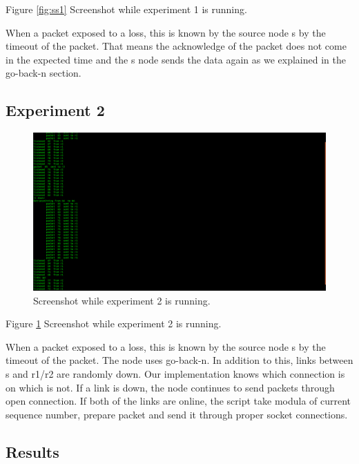 \documentclass[conference]{IEEEtran}
\begin{document}
Figure \ref{fig:ss1} Screenshot while experiment 1 is running.

When a packet exposed to a loss, this is known by the source node s by the timeout of the packet. That means the acknowledge of the packet does not come in the expected time and the s node sends the data again as we explained in the go-back-n section.

\subsection{Experiment 2}

\begin{figure}[h]
  \includegraphics[width=\linewidth]{experiment2.png}
  \caption{Screenshot while experiment 2 is running.}
  \label{fig:ss2}
\end{figure}

Figure \ref{fig:ss2} Screenshot while experiment 2 is running.

When a packet exposed to a loss, this is known by the source node s by the timeout of the packet. The node uses go-back-n. In addition to this, links between s and r1/r2 are randomly down. Our implementation knows which connection is on which is not. If a link is down, the node continues to send packets through open connection. If both of the links are online, the script take modula of current sequence number, prepare packet and send it through proper socket connections.

\subsection{Results}
\end{document}
